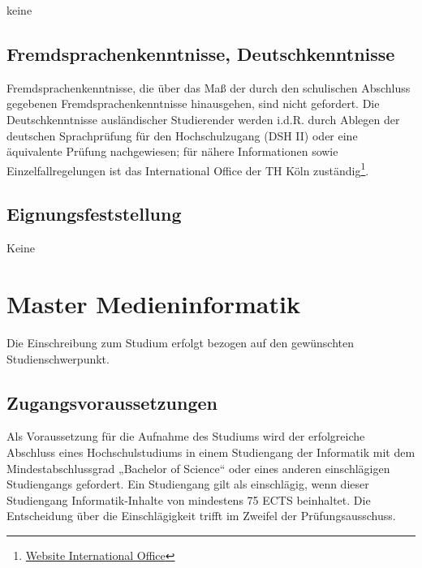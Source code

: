 keine

\subsection{Fremdsprachenkenntnisse,
Deutschkenntnisse\label{/mi-2017/selbstbericht/0500-studierbarkeit/0000-studierbarkeit}}\label{fremdsprachenkenntnisse-deutschkenntnissepathlabelmi-2017selbstbericht0500-studierbarkeit0000-studierbarkeit}

Fremdsprachenkenntnisse, die über das Maß der durch den schulischen
Abschluss gegebenen Fremdsprachenkenntnisse hinausgehen, sind nicht
gefordert. Die Deutschkenntnisse ausländischer Studierender werden
i.d.R. durch Ablegen der deutschen Sprachprüfung für den Hochschulzugang
(DSH II) oder eine äquivalente Prüfung nachgewiesen; für nähere
Informationen sowie Einzelfallregelungen ist das International Office
der TH Köln zuständig\footnote{\href{https://www.th-koeln.de/internationales/international-office_1986.php}{Website
  International Office}}.

\subsection{Eignungsfeststellung\label{/mi-2017/selbstbericht/0500-studierbarkeit/0000-studierbarkeit}}\label{eignungsfeststellungpathlabelmi-2017selbstbericht0500-studierbarkeit0000-studierbarkeit}

Keine

\section{Master
Medieninformatik\label{/mi-2017/selbstbericht/0500-studierbarkeit/0000-studierbarkeit}}\label{master-medieninformatikpathlabelmi-2017selbstbericht0500-studierbarkeit0000-studierbarkeit}

Die Einschreibung zum Studium erfolgt bezogen auf den gewünschten
Studienschwerpunkt.

\subsection{Zugangsvoraussetzungen\label{/mi-2017/selbstbericht/0500-studierbarkeit/0000-studierbarkeit}}\label{zugangsvoraussetzungenpathlabelmi-2017selbstbericht0500-studierbarkeit0000-studierbarkeit-1}

Als Voraussetzung für die Aufnahme des Studiums wird der erfolgreiche
Abschluss eines Hochschulstudiums in einem Studiengang der Informatik
mit dem Mindestabschlussgrad „Bachelor of Science`` oder eines anderen
einschlägigen Studiengangs gefordert. Ein Studiengang gilt als
einschlägig, wenn dieser Studiengang Informatik-Inhalte von mindestens
75 ECTS beinhaltet. Die Entscheidung über die Einschlägigkeit trifft im
Zweifel der Prüfungsausschuss.

